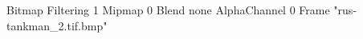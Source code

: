 {Bitmap
	{Filtering 1}
	{Mipmap 0}
	{Blend none}
	{AlphaChannel 0}
	{Frame "rus-tankman_2.tif.bmp"}
}
